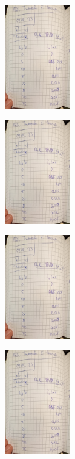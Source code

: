 \begin{minipage}[t]{0.4\textwidth}
    \includegraphics[height=4.5cm, page=5]{Abbildungen/v504_messdaten.pdf}
 \end{minipage}
 \begin{minipage}[t]{0.4\textwidth}
    \includegraphics[height=4.5cm, keepaspectratio, page=6]{Abbildungen/v504_messdaten.pdf}
 \end{minipage}
 \begin{minipage}[t]{0.4\textwidth}
    \includegraphics[height=4.5cm, page=7]{Abbildungen/v504_messdaten.pdf}
 \end{minipage}
 \begin{minipage}[t]{0.4\textwidth}
    \includegraphics[height=4.5cm, keepaspectratio, page=8]{Abbildungen/v504_messdaten.pdf}
 \end{minipage}

